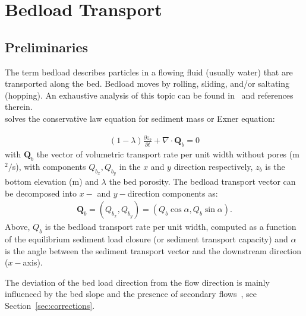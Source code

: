 \chapter[Bedload sediment transport]{Bedload Transport}\label{sec:BedloadTransport}

\section{Preliminaries}
The term bedload describes particles in a flowing fluid (usually water) that are transported along the bed. Bedload moves by rolling, sliding, and/or saltating (hopping). An exhaustive analysis of this topic can be found in~\cite{GarciaBook2006} and references therein.\\

\sisyphe{} solves the conservative law equation for sediment mass or Exner equation:

\begin{align}
(1-\lambda)\frac{\partial z_b}{\partial t} + \nabla\cdot \mathbf Q_b = 0
\label{eq:Exner}
\end{align}
with $\mathbf Q_b$ the vector of volumetric transport rate per unit width without pores (m$^2/$s), with components $Q_{b_x}, Q_{b_y}$ in the $x$ and $y$ direction respectively, $z_b$ is the bottom elevation (m) and $\lambda$ the bed porosity. The bedload transport vector can be decomposed into $x-$ and $y-$direction components as:
\begin{align}
\mathbf Q_b = (Q_{b_x}, Q_{b_y}) = (Q_b \cos\alpha, Q_b \sin\alpha).
\label{eq:bedloadtransportvector}
\end{align}
Above, $Q_b$ is the bedload transport rate per unit width, computed as a function of the equilibrium sediment load closure (or sediment transport capacity) and $\alpha$ is the angle between the sediment transport vector and the downstream direction ($x-$axis).

The deviation of the bed load direction from the flow direction is mainly influenced by the bed slope and the presence of secondary flows~\cite{Talmon95}, see Section~\ref{sec:corrections}.

